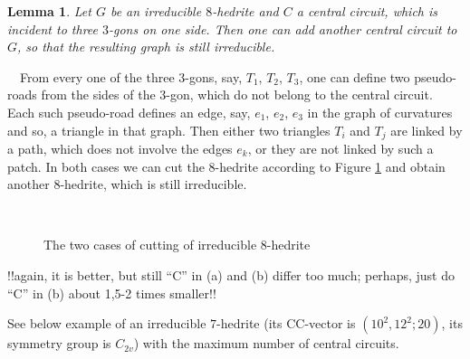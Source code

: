\documentclass[12pt]{article}
\newtheorem{lemma}{Lemma}
\newcommand{\proof}{\noindent{\bf Proof.}\ \ }
\begin{document}
\begin{lemma}
Let $G$ be an irreducible $8$-hedrite and $C$ a central circuit,
which is incident to three $3$-gons on one side. Then one can add another central circuit to $G$,  so that the resulting graph is still irreducible.
\end{lemma}
\proof From every one of the three $3$-gons, say, $T_1$, $T_2$, $T_3$, one can define two pseudo-roads from the sides of the $3$-gon, which do not belong to the central circuit.
Each such pseudo-road defines an edge, say, $e_1$, $e_2$, $e_3$ in the graph 
of curvatures and so, a triangle in that graph. Then either two triangles 
$T_i$ and $T_j$ are linked by a path, which does not involve the edges $e_k$,
or they are not linked by such a patch. In both cases we can cut the 
$8$-hedrite according to Figure \ref{TwoCasesCutting} and obtain 
another $8$-hedrite, which is still irreducible.


\begin{figure}
\centering
\mbox{
}
\caption{The two cases of cutting of irreducible $8$-hedrite}
\label{TwoCasesCutting}
\end{figure}
!!again, it is better, but still ``C'' in (a) and (b) differ too much;
perhaps, just do ``C'' in (b) about 1,5-2 times smaller!!

















See below example of an irreducible $7$-hedrite (its CC-vector is $(10^2, 12^2; 20)$, its symmetry group is $C_{2v}$) with the maximum number of central circuits.
\end{document}
